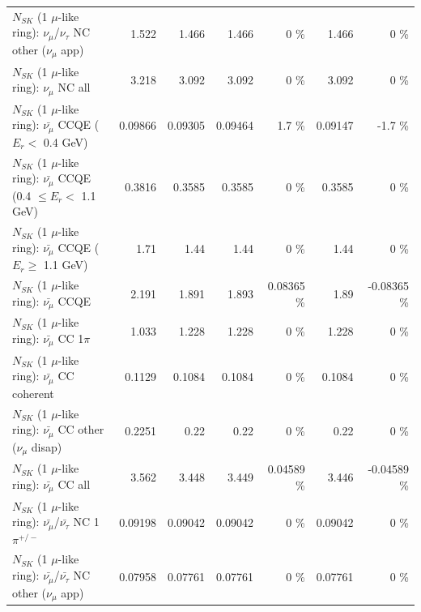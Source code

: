 \begin{table}
\begin{tabular}{| l | r | r | r  r | r  r |}
     $N_{SK}$ (1 $\mu$-like ring): $\nu_\mu$/$\nu_\tau$ NC other ($\nu_\mu$ app) &           1.522 &           1.466 &           1.466 &        0 \%  &           1.466 &        0 \%  \\ 
                                $N_{SK}$ (1 $\mu$-like ring): $\nu_{\mu}$ NC all &           3.218 &           3.092 &           3.092 &        0 \%  &           3.092 &        0 \%  \\ 
\hline
\hline
\hline
          $N_{SK}$ (1 $\mu$-like ring): $\bar{\nu_\mu}$ CCQE ($E_{r} <$ 0.4 GeV) &         0.09866 &         0.09305 &         0.09464 &      1.7 \%  &         0.09147 &     -1.7 \%  \\ 
 $N_{SK}$ (1 $\mu$-like ring): $\bar{\nu_\mu}$ CCQE (0.4 $\leq E_{r} <$ 1.1 GeV) &          0.3816 &          0.3585 &          0.3585 &        0 \%  &          0.3585 &        0 \%  \\ 
       $N_{SK}$ (1 $\mu$-like ring): $\bar{\nu_\mu}$ CCQE ($E_{r} \geq$ 1.1 GeV) &            1.71 &            1.44 &            1.44 &        0 \%  &            1.44 &        0 \%  \\ 
\hline
                              $N_{SK}$ (1 $\mu$-like ring): $\bar{\nu_\mu}$ CCQE &           2.191 &           1.891 &           1.893 &  0.08365 \%  &            1.89 & -0.08365 \%  \\ 
                         $N_{SK}$ (1 $\mu$-like ring): $\bar{\nu_\mu}$ CC 1$\pi$ &           1.033 &           1.228 &           1.228 &        0 \%  &           1.228 &        0 \%  \\ 
                       $N_{SK}$ (1 $\mu$-like ring): $\bar{\nu_\mu}$ CC coherent &          0.1129 &          0.1084 &          0.1084 &        0 \%  &          0.1084 &        0 \%  \\ 
        $N_{SK}$ (1 $\mu$-like ring): $\bar{\nu_\mu}$ CC other ($\nu_\mu$ disap) &          0.2251 &            0.22 &            0.22 &        0 \%  &            0.22 &        0 \%  \\ 
                          $N_{SK}$ (1 $\mu$-like ring): $\bar{\nu_{\mu}}$ CC all &           3.562 &           3.448 &           3.449 &  0.04589 \%  &           3.446 & -0.04589 \%  \\ 
\hline
  $N_{SK}$ (1 $\mu$-like ring): $\bar{\nu_\mu}$/$\bar{\nu_\tau}$ NC 1$\pi^{+/-}$ &         0.09198 &         0.09042 &         0.09042 &        0 \%  &         0.09042 &        0 \%  \\ 
$N_{SK}$ (1 $\mu$-like ring): $\bar{\nu_\mu}$/$\bar{\nu_\tau}$ NC other ($\nu_\mu$ app) &         0.07958 &         0.07761 &         0.07761 &        0 \%  &         0.07761 &        0 \%  \\ 

\end{tabular}
\end{table}
